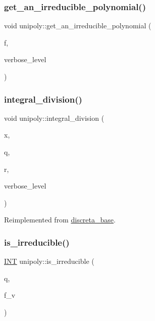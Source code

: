 \subsubsection{\texorpdfstring{get\+\_\+an\+\_\+irreducible\+\_\+polynomial()}{get\_an\_irreducible\_polynomial()}}
{\footnotesize\ttfamily void unipoly\+::get\+\_\+an\+\_\+irreducible\+\_\+polynomial (\begin{DoxyParamCaption}\item[{\mbox{\hyperlink{galois_8h_a09fddde158a3a20bd2dcadb609de11dc}{I\+NT}}}]{f,  }\item[{\mbox{\hyperlink{galois_8h_a09fddde158a3a20bd2dcadb609de11dc}{I\+NT}}}]{verbose\+\_\+level }\end{DoxyParamCaption})}

\mbox{\label{classunipoly_aeb794e4d6b10709ed6be7dae9826d705}} 
\subsubsection{\texorpdfstring{integral\+\_\+division()}{integral\_division()}}
{\footnotesize\ttfamily void unipoly\+::integral\+\_\+division (\begin{DoxyParamCaption}\item[{\mbox{\hyperlink{classdiscreta__base}{discreta\+\_\+base}} \&}]{x,  }\item[{\mbox{\hyperlink{classdiscreta__base}{discreta\+\_\+base}} \&}]{q,  }\item[{\mbox{\hyperlink{classdiscreta__base}{discreta\+\_\+base}} \&}]{r,  }\item[{\mbox{\hyperlink{galois_8h_a09fddde158a3a20bd2dcadb609de11dc}{I\+NT}}}]{verbose\+\_\+level }\end{DoxyParamCaption})\hspace{0.3cm}{\ttfamily [virtual]}}



Reimplemented from \mbox{\hyperlink{classdiscreta__base_a92b3001ac35af9185b316c0d8f89070e}{discreta\+\_\+base}}.

\mbox{\label{classunipoly_a9170111d259116a55616b165f7fde3c8}} 
\subsubsection{\texorpdfstring{is\+\_\+irreducible()}{is\_irreducible()}}
{\footnotesize\ttfamily \mbox{\hyperlink{galois_8h_a09fddde158a3a20bd2dcadb609de11dc}{I\+NT}} unipoly\+::is\+\_\+irreducible (\begin{DoxyParamCaption}\item[{\mbox{\hyperlink{galois_8h_a09fddde158a3a20bd2dcadb609de11dc}{I\+NT}}}]{q,  }\item[{\mbox{\hyperlink{galois_8h_a09fddde158a3a20bd2dcadb609de11dc}{I\+NT}}}]{f\+\_\+v }\end{DoxyParamCaption})}

